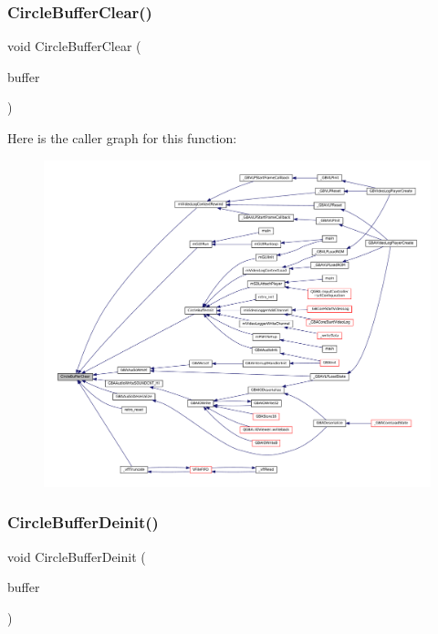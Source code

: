 \subsubsection{\texorpdfstring{Circle\+Buffer\+Clear()}{CircleBufferClear()}}
{\footnotesize\ttfamily void Circle\+Buffer\+Clear (\begin{DoxyParamCaption}\item[{struct Circle\+Buffer $\ast$}]{buffer }\end{DoxyParamCaption})}

Here is the caller graph for this function\+:
\nopagebreak
\begin{figure}[H]
\begin{center}
\leavevmode
\includegraphics[width=350pt]{circle-buffer_8c_a7f5170ef02fb49586dea9482e562c400_icgraph}
\end{center}
\end{figure}
\mbox{\label{circle-buffer_8c_ace75de8785dd1b075cab547bf6f81563}} 
\subsubsection{\texorpdfstring{Circle\+Buffer\+Deinit()}{CircleBufferDeinit()}}
{\footnotesize\ttfamily void Circle\+Buffer\+Deinit (\begin{DoxyParamCaption}\item[{struct Circle\+Buffer $\ast$}]{buffer }\end{DoxyParamCaption})}

